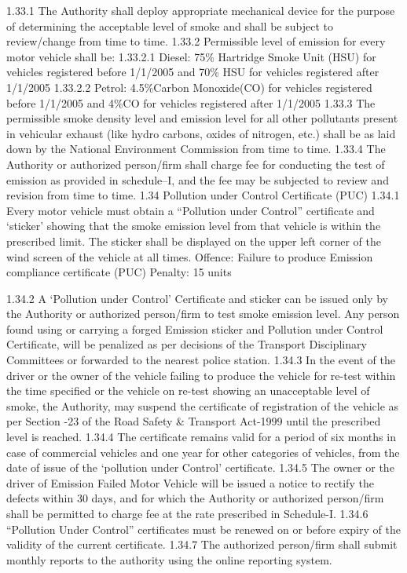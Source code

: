 \documentclass[
]{book}
\begin{document}
1.33.1 The Authority shall deploy appropriate mechanical device for the purpose of determining the acceptable level of smoke and shall be subject to review/change from time to time.
1.33.2 Permissible level of emission for every motor vehicle shall be:
1.33.2.1 Diesel: 75\% Hartridge Smoke Unit (HSU) for vehicles registered before 1/1/2005 and 70\% HSU for vehicles registered after 1/1/2005
1.33.2.2 Petrol: 4.5\%Carbon Monoxide(CO) for vehicles registered before 1/1/2005 and 4\%CO for vehicles registered after 1/1/2005
1.33.3 The permissible smoke density level and emission level for all other pollutants present in vehicular exhaust (like hydro carbons, oxides of nitrogen, etc.) shall be as laid down by the National Environment Commission from time to time.
1.33.4 The Authority or authorized person/firm shall charge fee for conducting the test of emission as provided in schedule--I, and the fee may be subjected to review and revision from time to time.
1.34 Pollution under Control Certificate (PUC)
1.34.1 Every motor vehicle must obtain a ``Pollution under Control'' certificate and `sticker' showing that the smoke emission level from that vehicle is within the prescribed limit. The sticker shall be displayed on the upper left corner of the wind screen of the vehicle at all times.
Offence: Failure to produce Emission compliance certificate (PUC)
Penalty: 15 units

1.34.2 A `Pollution under Control' Certificate and sticker can be issued only by the Authority or authorized person/firm to test smoke emission level. Any person found using or carrying a forged Emission sticker and Pollution under Control Certificate, will be penalized as per decisions of the Transport Disciplinary Committees or forwarded to the nearest police station.
1.34.3 In the event of the driver or the owner of the vehicle failing to produce the vehicle for re-test within the time specified or the vehicle on re-test showing an unacceptable level of smoke, the Authority, may suspend the certificate of registration of the vehicle as per Section -23 of the Road Safety \& Transport Act-1999 until the prescribed level is reached.
1.34.4 The certificate remains valid for a period of six months in case of commercial vehicles and one year for other categories of vehicles, from the date of issue of the `pollution under Control' certificate.
1.34.5 The owner or the driver of Emission Failed Motor Vehicle will be issued a notice to rectify the defects within 30 days, and for which the Authority or authorized person/firm shall be permitted to charge fee at the rate prescribed in Schedule-I.
1.34.6 ``Pollution Under Control'' certificates must be renewed on or before expiry of the validity of the current certificate.
1.34.7 The authorized person/firm shall submit monthly reports to the authority using the online reporting system.
\end{document}
